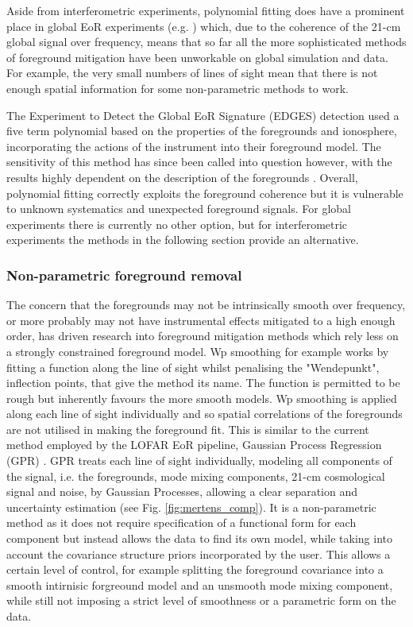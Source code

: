 Aside from interferometric experiments, polynomial fitting does have a prominent place in global EoR experiments (e.g. \citet{Singh2018ApJ...858...54S,Bowman2018Natur.555...67B}) which, due to the coherence of the 21-cm global signal over frequency, means that so far all the more sophisticated methods of foreground mitigation have been unworkable on global simulation and data. For example, the very small numbers of lines of sight mean that there is not enough spatial information for some non-parametric methods to work.

The Experiment to Detect the Global EoR Signature (EDGES) detection \citet{Bowman2018Natur.555...67B} used a five term polynomial based on the properties of the foregrounds and ionosphere, incorporating the actions of the instrument into their foreground model. The sensitivity of this method has since been called into question however, with the results highly dependent on the description of the foregrounds \citep{Bradley2019ApJ...874..153B,Hills2018arXiv180501421H}. Overall, polynomial fitting correctly exploits the foreground coherence but it is vulnerable to unknown systematics and unexpected foreground signals. For global experiments there is currently no other option, but for interferometric experiments the methods in the following section provide an alternative.

\subsubsection{Non-parametric foreground removal}
\label{sec:nonpar}
The concern that the foregrounds may not be intrinsically smooth over frequency, or more probably may not have instrumental effects mitigated to a high enough order, has driven research into foreground mitigation methods which rely less on a strongly constrained foreground model. Wp smoothing \citet{Harker2009MNRAS.397.1138H} for example works by fitting a function along the line of sight whilst penalising the "Wendepunkt", inflection points, that give the method its name. The function is permitted to be rough but inherently favours the more smooth models. Wp smoothing is applied along each line of sight individually and so spatial correlations of the foregrounds are not utilised in making the foreground fit. This is similar to the current method employed by the LOFAR EoR pipeline, Gaussian Process Regression (GPR) \citet{Mertens2018MNRAS.478.3640M}. GPR treats each line of sight individually, modeling all components of the signal, i.e. the foregrounds, mode mixing components, 21-cm cosmological signal and noise, by Gaussian Processes, allowing a clear separation and uncertainty estimation (see Fig. \ref{fig:mertens_comp}). It is a non-parametric method as it does not require specification of a functional form for each component but instead allows the data to find its own model, while taking into account the covariance structure priors incorporated by the user. This allows a certain level of control, for example splitting the foreground covariance into a smooth intirnisic forgreound model and an unsmooth mode mixing component, while still not imposing a strict level of smoothness or a parametric form on the data.

